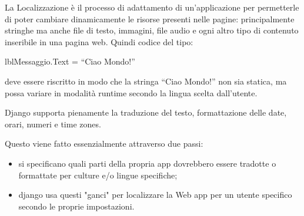 La Localizzazione è il processo di adattamento di un’applicazione per permetterle di poter cambiare dinamicamente le risorse presenti nelle pagine: principalmente stringhe ma anche file di testo, immagini, file audio e ogni altro tipo di contenuto inseribile in una pagina web.
Quindi codice del tipo:

lblMessaggio.Text = “Ciao Mondo!”

deve essere riscritto in modo che la stringa “Ciao Mondo!” non sia statica, ma possa variare in modalità runtime secondo la lingua scelta dall’utente.

Django supporta pienamente la traduzione del testo, formattazione delle date, orari, numeri e  time zones.

Questo viene fatto essenzialmente attraverso due passi:
\begin{itemize}
	\item si specificano quali parti della propria app dovrebbero essere tradotte o formattate per culture e/o lingue specifiche;
	\item django usa questi "ganci" per localizzare la Web app per un utente specifico secondo le proprie impostazioni.
\end{itemize}
\endinput
